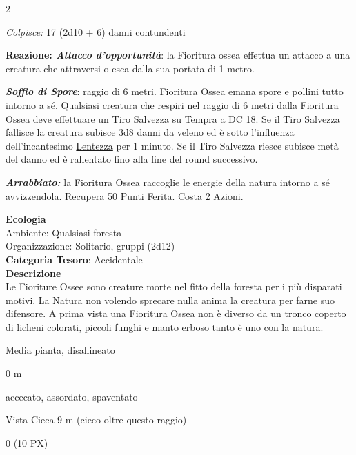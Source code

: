 \begin{multicols}{2}
{\emph{Colpisce:} 17 (2d10 + 6) danni contundenti

\textbf{Reazione: \emph{Attacco d'opportunità}}: la Fioritura ossea effettua un attacco a una creatura che attraversi o esca dalla sua portata di 1 metro.

\emph{\textbf{Soffio di Spore}}: raggio di 6 metri. Fioritura Ossea emana spore e pollini tutto intorno a sé. Qualsiasi creatura che respiri nel raggio di 6 metri dalla Fioritura Ossea deve effettuare un Tiro Salvezza su Tempra a DC 18. Se il Tiro Salvezza fallisce la creatura subisce 3d8 danni da veleno ed è sotto l'influenza dell'incantesimo \hyperlink{lentezza}{Lentezza} per 1 minuto. Se il Tiro Salvezza riesce subisce metà del danno ed è rallentato fino alla fine del round successivo.

\emph{\textbf{Arrabbiato:}} la Fioritura Ossea raccoglie le energie della natura intorno a sé avvizzendola. Recupera 50 Punti Ferita. Costa 2 Azioni.

\textbf{Ecologia}\\
Ambiente: Qualsiasi foresta\\
Organizzazione: Solitario, gruppi (2d12)\\
\textbf{Categoria Tesoro}: Accidentale\\
\textbf{Descrizione}\\
Le Fioriture Ossee sono creature morte nel fitto della foresta per i più disparati motivi. La Natura non volendo sprecare nulla anima la creatura per farne suo difensore. A prima vista una Fioritura Ossea non è diverso da un tronco coperto di licheni colorati, piccoli funghi e manto erboso tanto è uno con la natura.

\begin{description}[noitemsep, topsep=0pt, parsep=0pt, partopsep=0pt, itemsep=1pt, leftmargin=2.35cm,  labelwidth=2.2cm, itemindent=0cm, listparindent=0pt] %
\setlength{\baselineskip}{10pt}
\item[\textbf{Taglia/Tipo}] Media pianta, disallineato
\item[\textbf{Caratt.}] 
\item[\textbf{Punti Ferita}] 
\item[\textbf{Movimento}] 0 m
\item[\textbf{Tiri Salvez.}] 
\item[\textbf{Immunità}] accecato, assordato, spaventato
\item[\textbf{Sensi}] Vista Cieca 9 m (cieco oltre questo raggio)
\item[\textbf{Sfida}] 0 (10 PX)
\end{description}
\smallskip

}
\end{multicols}
